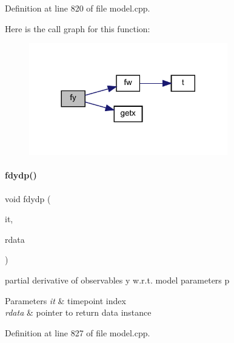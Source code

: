 Definition at line 820 of file model.\+cpp.

Here is the call graph for this function\+:
\nopagebreak
\begin{figure}[H]
\begin{center}
\leavevmode
\includegraphics[width=245pt]{classamici_1_1_model_acd37693bbc14eead48d9a40c72f42a89_cgraph}
\end{center}
\end{figure}
\mbox{\label{classamici_1_1_model_a884ccb083130cb1af7ebe93f7a6d361a}} 
\paragraph{\texorpdfstring{fdydp()}{fdydp()}\hspace{0.1cm}{\footnotesize\ttfamily [1/2]}}
{\footnotesize\ttfamily void fdydp (\begin{DoxyParamCaption}\item[{const int}]{it,  }\item[{\mbox{\hyperlink{classamici_1_1_return_data}{Return\+Data}} $\ast$}]{rdata }\end{DoxyParamCaption})}

partial derivative of observables y w.\+r.\+t. model parameters p 
\begin{DoxyParams}{Parameters}
{\em it} & timepoint index \\
\hline
{\em rdata} & pointer to return data instance \\
\hline
\end{DoxyParams}


Definition at line 827 of file model.\+cpp.

